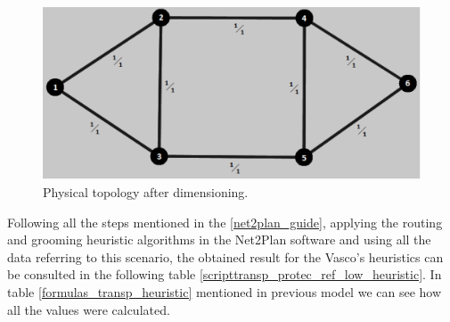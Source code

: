 \begin{figure}[H]
\centering
\includegraphics[width=13cm]{sdf/heuristic/transparent_protection/figures/physical_topology}
\caption{Physical topology after dimensioning.}
\label{physical_topology_protection_ref_low_heuristic_transparent}
\end{figure}

Following all the steps mentioned in the \ref{net2plan_guide}, applying the routing and grooming heuristic algorithms in the Net2Plan software and using all the data referring to this scenario, the obtained result for the Vasco's heuristics can be consulted in the following table \ref{scripttransp_protec_ref_low_heuristic}. In table \ref{formulas_transp_heuristic} mentioned in previous model we can see how all the values were calculated. \\

